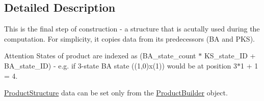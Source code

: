 \subsection{\-Detailed \-Description}
\-This is the final step of construction -\/ a structure that is acutally used during the computation. \-For simplicity, it copies data from its predecessors (\-B\-A and \-P\-K\-S). \begin{DoxyAttention}{\-Attention}
\-States of product are indexed as (\-B\-A\-\_\-state\-\_\-count $\ast$ \-K\-S\-\_\-state\-\_\-\-I\-D + \-B\-A\-\_\-state\-\_\-\-I\-D) -\/ e.\-g. if 3-\/state \-B\-A state ((1,0)x(1)) would be at position 3$\ast$1 + 1 = 4.
\end{DoxyAttention}
\hyperlink{classProductStructure}{\-Product\-Structure} data can be set only from the \hyperlink{classProductBuilder}{\-Product\-Builder} object. 

